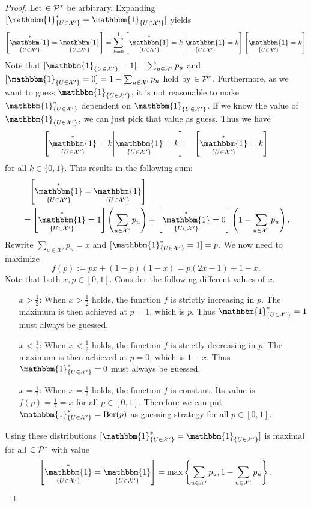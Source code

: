 \documentclass[twoside,a4paper]{report}
\theoremstyle{plain}
\theoremstyle{definition}
\theoremstyle{remark}
\numberwithin{equation}{chapter}
\let\P\relax
\DeclareMathOperator{\P}{\mathbb{P}}
\DeclareMathOperator{\1}{\mathbbm{1}}
\newcommand{\X}{\mathcal{X}}
\newcommand{\Pmod}{\mathcal{P}^*}
\newcommand{\GeneralGenInd}{\1_{\{U\in\X'\}}}
\begin{document}
\begin{proof}
Let $\P\in\Pmod$ be arbitrary. Expanding $\P[\GeneralGenInd^*=\GeneralGenInd]$ yields
\begin{equation}
\P\left[\GeneralGenInd^*=\GeneralGenInd\right]=\sum_{k=0}^1\P\left[\GeneralGenInd^*=k\middle|\GeneralGenInd=k\right]\P\left[\GeneralGenInd=k\right]
\end{equation}
Note that $\P[\GeneralGenInd=1]=\sum_{u\in\X'}p_u$ and $\P[\GeneralGenInd=0]=1-\sum_{u\in\X'}p_u$ hold by $\P\in\Pmod$. Furthermore, as we want to guess $\GeneralGenInd$, it is not reasonable to make $\GeneralGenInd^*$ dependent on $\GeneralGenInd$. If we know the value of $\GeneralGenInd$, we can just pick that value as guess. Thus we have
\begin{equation}
\P\left[\GeneralGenInd^*=k\middle|\GeneralGenInd=k\right]=\P\left[\GeneralGenInd^*=k\right]
\end{equation}
for all $k\in\{0,1\}$. This results in the following sum:
\begin{align}
&\phantom{=}\P\left[\GeneralGenInd^*=\GeneralGenInd\right]\\
&=\P\left[\GeneralGenInd^*=1\right]\left(\sum_{u\in\X'}p_u\right)+\P\left[\GeneralGenInd^*=0\right]\left(1-\sum_{u\in\X'}p_u\right).
\end{align}
Rewrite $\sum_{u\in\X'}p_u=x$ and $\P[\GeneralGenInd^*=1]=p$. We now need to maximize
\begin{equation}
f(p):=px+(1-p)(1-x)=p(2x-1)+1-x.
\end{equation}
Note that both $x,p\in[0,1]$. Consider the following different values of $x$.
\begin{itemize}
    \item[$x>\frac{1}{2}$:] When $x>\frac{1}{2}$ holds, the function $f$ is strictly increasing in $p$. The maximum is then achieved at $p=1$, which is $p$. Thus $\1_{\{U\in\X'\}}^*=1$ must always be guessed.
    \item[$x<\frac{1}{2}$:] When $x<\frac{1}{2}$ holds, the function $f$ is strictly decreasing in $p$. The maximum is then achieved at $p=0$, which is $1-x$. Thus $\1_{\{U\in\X'\}}^*=0$ must always be guessed.
    \item[$x=\frac{1}{2}$:] When $x=\frac{1}{2}$ holds, the function $f$ is constant. Its value is $f(p)=\frac{1}{2}=x$ for all $p\in[0,1]$. Therefore we can put $\GeneralGenInd^*=\mathrm{Ber}(p)$ as guessing strategy for all $p\in[0,1]$.
\end{itemize}
Using these distributions $\P[\GeneralGenInd^*=\GeneralGenInd]$ is maximal for all $\P\in\Pmod$ with value 
\begin{equation}
\P\left[\GeneralGenInd^*=\GeneralGenInd\right]=\max\left\{\sum_{u\in\X'}p_u,1-\sum_{u\in\X'}p_u\right\}.
\end{equation}
\end{proof}
\end{document}
